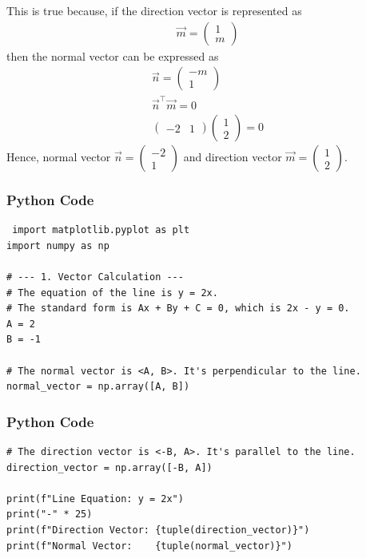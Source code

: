 \documentclass{beamer}
\begin{document}
\begin{frame}
This is true because, if the direction vector is represented as
\begin{align}
\vec{m} = \begin{pmatrix} 1 \\ m \end{pmatrix}
\end{align}
then the normal vector can be expressed as
\begin{align}
  \vec{n} = \begin{pmatrix} -m \\ 1 \end{pmatrix} \\
  \vec{n}^\top \vec{m} =0\\
   \begin{pmatrix} -2 & 1 \end{pmatrix}\begin{pmatrix} 1 \\ 2 \end{pmatrix}=0
\end{align}
Hence, normal vector $\vec{n} = \begin{pmatrix} -2 \\ 1 \end{pmatrix}$ and direction vector  $\vec{m} = \begin{pmatrix} 1 \\ 2 \end{pmatrix}$.

\end{frame}


\begin{frame}[fragile]
    \frametitle{Python Code}
    \begin{lstlisting}
 import matplotlib.pyplot as plt
import numpy as np

# --- 1. Vector Calculation ---
# The equation of the line is y = 2x.
# The standard form is Ax + By + C = 0, which is 2x - y = 0.
A = 2
B = -1

# The normal vector is <A, B>. It's perpendicular to the line.
normal_vector = np.array([A, B])

\end{lstlisting}
\end{frame}

\begin{frame}[fragile]
    \frametitle{Python Code}

    \begin{lstlisting}
# The direction vector is <-B, A>. It's parallel to the line.
direction_vector = np.array([-B, A])

print(f"Line Equation: y = 2x")
print("-" * 25)
print(f"Direction Vector: {tuple(direction_vector)}")
print(f"Normal Vector:    {tuple(normal_vector)}")

    \end{lstlisting}
\end{frame}
\end{document}
